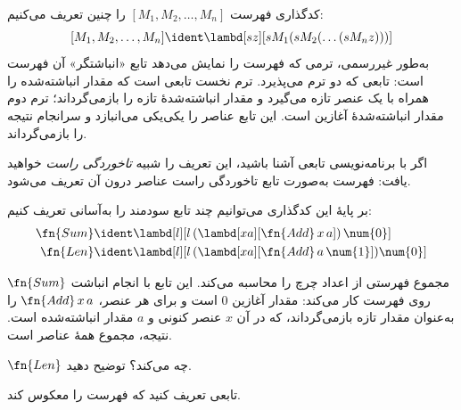 \documentclass[../../../include/open-logic-section]{subfiles}
\begin{document}

کدگذاری فهرست $[M_1, M_2, \ldots, M_n]$ را چنین تعریف می‌کنیم:
\[
  [M_1, M_2, \ldots, M_n] \ident \lambd[sz][s M_1 (s M_2 (\ldots (s M_n z)))]
\]
به‌طور غیررسمی، ترمی که فهرست را نمایش می‌دهد تابع «انباشتگر» آن
فهرست است: تابعی که دو ترم می‌پذیرد. ترم نخست تابعی است که مقدار
انباشته‌شده را همراه با یک عنصر تازه می‌گیرد و مقدار انباشته‌شدهٔ تازه
را بازمی‌گرداند؛ ترم دوم مقدار انباشته‌شدهٔ آغازین است. این تابع عناصر
را یکی‌یکی می‌انبازد و سرانجام نتیجه را بازمی‌گرداند.

\begin{digress}
  اگر با برنامه‌نویسی تابعی آشنا باشید، این تعریف را شبیه
  \emph{تاخوردگی راست} خواهید یافت: فهرست به‌صورت تابع تاخوردگی راست
  عناصر درون آن تعریف می‌شود.
\end{digress}

بر پایهٔ این کدگذاری می‌توانیم چند تابع سودمند را به‌آسانی تعریف کنیم:
\begin{align*}
  \fn{Sum} & \ident
  \lambd[l][l \, (\lambd[xa][\fn{Add} \, x \, a])\,  \num{0}]\\
  \fn{Len} & \ident
  \lambd[l][l \, (\lambd[xa][\fn{Add} \, a \, \num{1}]) \num{0}]
\end{align*}

$\fn{Sum}$ مجموع فهرستی از اعداد چرچ را محاسبه می‌کند. این تابع با
انجام انباشت روی فهرست کار می‌کند: مقدار آغازین $\num{0}$ است و برای
هر عنصر، $\fn{Add} \, x\, a$ را به‌عنوان مقدار تازه بازمی‌گرداند، که
در آن $x$ عنصر کنونی و $a$ مقدار انباشته‌شده است. نتیجه، مجموع همهٔ
عناصر است.

\begin{prob}
  $\fn{Len}$ چه می‌کند؟ توضیح دهید.
\end{prob}

\begin{prob}
  تابعی تعریف کنید که فهرست را معکوس کند.
\end{prob}
\end{document}
